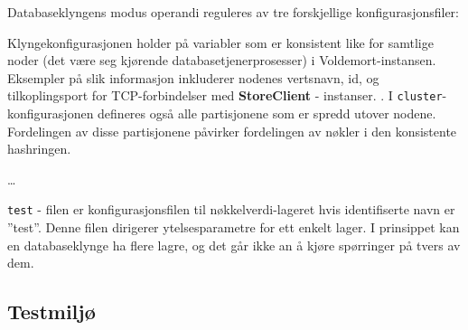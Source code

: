 Databaseklyngens modus operandi reguleres av tre forskjellige konfigurasjonsfiler:



Klyngekonfigurasjonen holder på variabler som er konsistent like for samtlige noder (det være seg kjørende database\-tjener\-prosesser) i Voldemort-instansen. Eksempler på slik informasjon inkluderer nodenes vertsnavn, id, og tilkoplingsport for TCP-forbindelser med \textbf{StoreClient} - instanser.  \citep{kreps2009}. I \texttt{cluster}-konfigurasjonen defineres også alle partisjonene som er spredd utover nodene. Fordelingen av disse partisjonene påvirker fordelingen av nøkler i den konsistente hashringen.



\ldots


\texttt{test} - filen er konfigurasjonsfilen til nøkkelverdi-lageret hvis identifiserte navn er ''test''. Denne filen dirigerer ytelsesparametre for ett enkelt lager. I prinsippet kan en databaseklynge ha flere lagre, og det går ikke an å kjøre spørringer på tvers av dem.

\subsection{Testmiljø}



